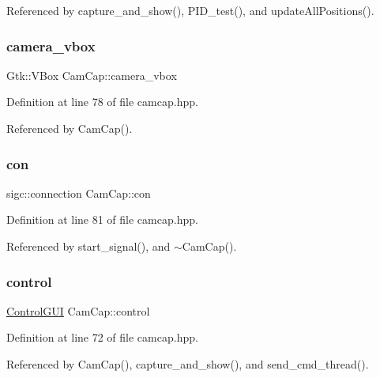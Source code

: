 Referenced by capture\+\_\+and\+\_\+show(), P\+I\+D\+\_\+test(), and update\+All\+Positions().

\mbox{\label{class_cam_cap_a4a00cd71f3f2ab88b985f53e527613fd}} 
\subsubsection{\texorpdfstring{camera\+\_\+vbox}{camera\_vbox}}
{\footnotesize\ttfamily Gtk\+::\+V\+Box Cam\+Cap\+::camera\+\_\+vbox}



Definition at line 78 of file camcap.\+hpp.



Referenced by Cam\+Cap().

\mbox{\label{class_cam_cap_a608a3c47ba3c1c046794e3f074b97cea}} 
\subsubsection{\texorpdfstring{con}{con}}
{\footnotesize\ttfamily sigc\+::connection Cam\+Cap\+::con}



Definition at line 81 of file camcap.\+hpp.



Referenced by start\+\_\+signal(), and $\sim$\+Cam\+Cap().

\mbox{\label{class_cam_cap_a0e2b26d564d6baa6f5f60ce7227ad53f}} 
\subsubsection{\texorpdfstring{control}{control}}
{\footnotesize\ttfamily \hyperlink{class_control_g_u_i}{Control\+G\+UI} Cam\+Cap\+::control}



Definition at line 72 of file camcap.\+hpp.



Referenced by Cam\+Cap(), capture\+\_\+and\+\_\+show(), and send\+\_\+cmd\+\_\+thread().

\mbox{\label{class_cam_cap_a516da4047c872d26767e50fb09799400}} 
